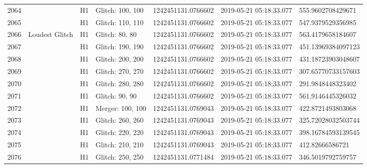\begin{longtable}{lllllll}
2064 &                                                    &       H1 &  Glitch: 100, 100 &  1242451131.0766602 &  2019-05-21 05:18:33.077 &   555.9602708429671 \\
2065 &                                                    &       H1 &  Glitch: 110, 110 &  1242451131.0766602 &  2019-05-21 05:18:33.077 &   547.9379529356985 \\
2066 &                                     Loudest Glitch &       H1 &    Glitch: 80, 80 &  1242451131.0766602 &  2019-05-21 05:18:33.077 &   563.4179658184607 \\
2067 &                                                    &       H1 &  Glitch: 190, 190 &  1242451131.0766602 &  2019-05-21 05:18:33.077 &  451.13969384097123 \\
2068 &                                                    &       H1 &  Glitch: 200, 200 &  1242451131.0766602 &  2019-05-21 05:18:33.077 &  431.18723903048607 \\
2069 &                                                    &       H1 &  Glitch: 270, 270 &  1242451131.0766602 &  2019-05-21 05:18:33.077 &  307.65770733157603 \\
2070 &                                                    &       H1 &  Glitch: 280, 280 &  1242451131.0766602 &  2019-05-21 05:18:33.077 &   291.9848448323402 \\
2071 &                                                    &       H1 &    Glitch: 90, 90 &  1242451131.0766602 &  2019-05-21 05:18:33.077 &   561.9146445326032 \\
2072 &                                                    &       H1 &  Merger: 100, 100 &  1242451131.0769043 &  2019-05-21 05:18:33.077 &   422.8721493803068 \\
2073 &                                                    &       H1 &  Glitch: 260, 260 &  1242451131.0769043 &  2019-05-21 05:18:33.077 &  325.72028032503744 \\
2074 &                                                    &       H1 &  Glitch: 220, 220 &  1242451131.0769043 &  2019-05-21 05:18:33.077 &  398.16784593139545 \\
2075 &                                                    &       H1 &  Glitch: 210, 210 &  1242451131.0769043 &  2019-05-21 05:18:33.077 &     412.82666586721 \\
2076 &                                                    &       H1 &  Glitch: 250, 250 &  1242451131.0771484 &  2019-05-21 05:18:33.077 &   346.5019792759757 \\

\end{longtable}
